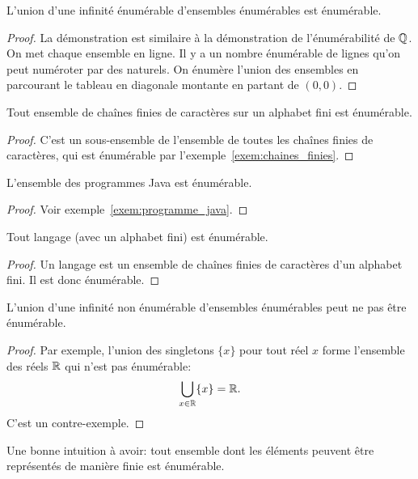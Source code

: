 \begin{myprop}
	L'union d'une infinité énumérable d'ensembles énumérables est énumérable.
    \begin{proof}
      La démonstration est similaire à la démonstration de l'énumérabilité de $\mathbb{Q}$.
      On met chaque ensemble en ligne. Il y a un nombre énumérable de lignes qu'on peut numéroter par des naturels.
      On énumère l'union des ensembles en parcourant le tableau en diagonale montante en partant de $(0,0)$.
    \end{proof}
\end{myprop}

\begin{myprop}
 Tout ensemble de chaînes finies de caractères sur un alphabet fini est énumérable.
 \begin{proof}
C'est un sous-ensemble de l'ensemble de toutes les chaînes finies de caractères, qui est énumérable par l'exemple~\ref{exem:chaines_finies}.
 \end{proof}
\end{myprop}

\begin{myprop} \label{prop:programme_enumerable}
 L'ensemble des programmes Java est énumérable.
 \begin{proof}
  Voir exemple~\ref{exem:programme_java}.
 \end{proof}
\end{myprop}


\begin{myprop}
 Tout langage (avec un alphabet fini) est énumérable.
 \begin{proof}
 Un langage est un ensemble de chaînes finies de caractères d'un alphabet fini. Il est donc énumérable.
 \end{proof}
\end{myprop}

\begin{myprop}
L'union d'une infinité non énumérable d'ensembles énumérables peut ne pas être énumérable.
\end{myprop}
\begin{proof}
Par exemple, l'union des singletons $\{x\}$ pour tout réel $x$ forme l'ensemble des réels $\mathbb{R}$ qui n'est pas énumérable:
\[ \bigcup_{x \in \mathbb{R}} \{x\} = \mathbb{R}. \]
C'est un contre-exemple.
\end{proof}

\begin{myrem}
  Une bonne intuition à avoir:
  tout ensemble dont les éléments peuvent être représentés de manière finie est énumérable.
\end{myrem}

